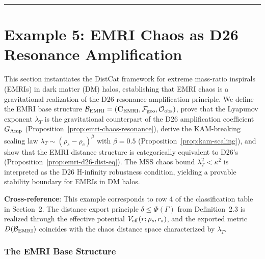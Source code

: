 \documentclass[
]{article}
\begin{document}
\begin{center}\rule{0.5\linewidth}{0.5pt}\end{center}


\section{Example 5: EMRI Chaos as D26 Resonance Amplification}\label{sec:example5-emri}

This section instantiates the DistCat framework for extreme mass-ratio inspirals (EMRIs) in dark matter (DM) halos, establishing that EMRI chaos is a gravitational realization of the D26 resonance amplification principle. We define the EMRI base structure $\mathcal{B}_{\rm EMRI} = (\mathbf{C}_{\rm EMRI}, \mathcal{F}_{\rm geo}, \mathcal{O}_{\rm obs})$, prove that the Lyapunov exponent $\lambda_T$ is the gravitational counterpart of the D26 amplification coefficient $G_{\rm Amp}$ (Proposition~\ref{prop:emri-chaos-resonance}), derive the KAM-breaking scaling law $\lambda_T \sim (\rho_s - \rho_c)^\beta$ with $\beta = 0.5$ (Proposition~\ref{prop:kam-scaling}), and show that the EMRI distance structure is categorically equivalent to D26's (Proposition~\ref{prop:emri-d26-dist-eq}). The MSS chaos bound $\lambda_T^2 < \kappa^2$ is interpreted as the D26 H-infinity robustness condition, yielding a provable stability boundary for EMRIs in DM halos.

\textbf{Cross-reference}: This example corresponds to row 4 of the classification table in Section~2. The distance export principle $\delta \leq \Phi(\Gamma)$ from Definition~2.3 is realized through the effective potential $V_{\rm eff}(r; \rho_s, r_s)$, and the exported metric $D(\mathcal{B}_{\rm EMRI})$ coincides with the chaos distance space characterized by $\lambda_T$.

\subsubsection{The EMRI Base Structure}\label{subsec:emri-base}
\end{document}
